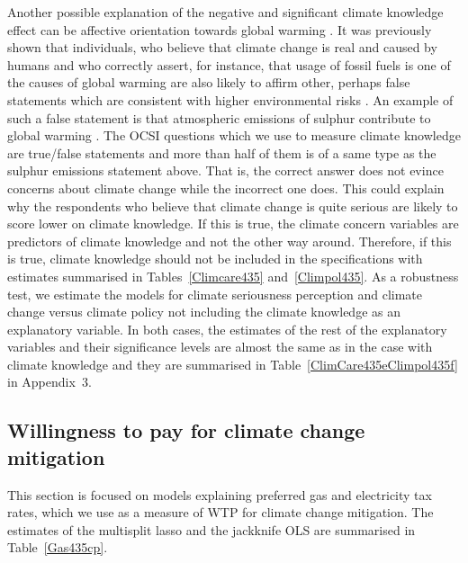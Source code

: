 \documentclass[a4paper,12pt]{article}
\begin{document}
Another possible explanation of the negative and significant climate knowledge effect can be affective orientation towards global warming \citep{Kahan2015}. It was previously shown that individuals, who believe that climate change is real and caused by humans and who correctly assert, for instance, that usage of fossil fuels is one of the causes of global warming are also likely to affirm other, perhaps false statements which are consistent with higher environmental risks \citep{reynolds2010now}. An example of such a false statement is that atmospheric emissions of sulphur contribute to global warming \citep{Kahan2015}. The OCSI questions which we use to measure climate knowledge are true/false statements and more than half of them is of a same type as the sulphur emissions statement above. That is, the correct answer does not evince concerns about climate change while the incorrect one does. This could explain why the respondents who believe that climate change is quite serious are likely to score lower on climate knowledge. If this is true, the climate concern variables are predictors of climate knowledge and not the other way around. Therefore, if this is true, climate knowledge should not be included in the specifications with estimates summarised in Tables~\ref{Climcare435} and~\ref{Climpol435}. As a robustness test, we estimate the models for climate seriousness perception and climate change versus climate policy not including the climate knowledge as an explanatory variable. In both cases, the estimates of the rest of the explanatory variables and their significance levels are almost the same as in the case with climate knowledge and they are summarised in Table~\ref{ClimCare435eClimpol435f} in Appendix~$3$.





















\subsection{Willingness to pay for climate change mitigation}\label{ResWTP}
This section is focused on models explaining preferred gas and electricity tax rates, which we use as a measure of WTP for climate change mitigation. The estimates of the multisplit lasso and the jackknife OLS are summarised in Table~\ref{Gas435cp}.
\end{document}
